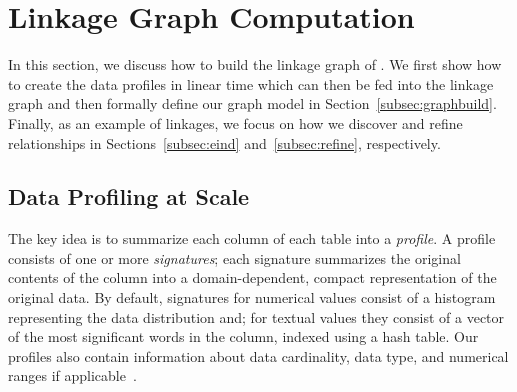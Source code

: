 \section{Linkage Graph Computation}
\label{sec:stitching}

In this section, we discuss how to build the linkage graph of \dcv. We first show how to create the data profiles in linear time which can then be fed into the linkage graph and then formally define our graph model in Section~\ref{subsec:graphbuild}. Finally, 
as an example of linkages, we focus on how we discover and refine \pkfk relationships in Sections~\ref{subsec:eind} and~\ref{subsec:refine}, respectively.



\subsection{Data Profiling at Scale}\label{subsec:profile}

The key idea is to summarize each column of each table into a {\em profile}.
A profile consists of one or more {\it signatures};  each signature summarizes
the original contents of the column into a domain-dependent, compact
representation of the original data.  By default, signatures for numerical values consist of a
histogram representing the data distribution and; for textual values they consist of a vector
of the most significant words in the column, indexed using a hash table.  Our profiles also
contain information about data cardinality, data type, and numerical ranges if
applicable~\cite{profiling_survey}.  


